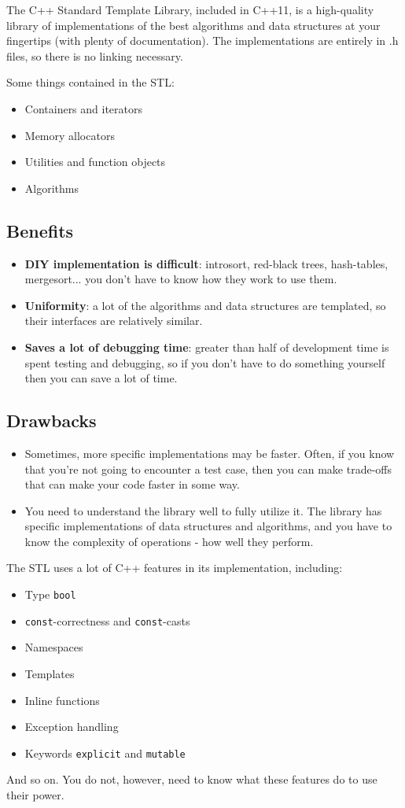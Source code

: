The C++ Standard Template Library, included in C++11, is a high-quality library of implementations of the best algorithms and data structures at your fingertips (with plenty of documentation). The implementations are entirely in .h files, so there is no linking necessary.

Some things contained in the STL:
\begin{itemize}
	\item Containers and iterators
	\item Memory allocators
	\item Utilities and function objects
	\item Algorithms
\end{itemize}

\subsection{Benefits}
\begin{itemize}
	\item \textbf{DIY implementation is difficult}: introsort, red-black trees, hash-tables, mergesort... you don't have to know how they work to use them.
	\item \textbf{Uniformity}: a lot of the algorithms and data structures are templated, so their interfaces are relatively similar.
	\item \textbf{Saves a lot of debugging time}: greater than half of development time is spent testing and debugging, so if you don't have to do something yourself then you can save a lot of time.
\end{itemize}

\subsection{Drawbacks}
\begin{itemize}
	\item Sometimes, more specific implementations may be faster. Often, if you know that you're not going to encounter a test case, then you can make trade-offs that can make your code faster in some way.
	\item You need to understand the library well to fully utilize it. The library has specific implementations of data structures and algorithms, and you have to know the complexity of operations - how well they perform.
\end{itemize}
The STL uses a lot of C++ features in its implementation, including:
\begin{itemize}
	\item Type \lstinline[style=C++]{bool}
	\item \lstinline[style=C++]{const}-correctness and \lstinline[style=C++]{const}-casts
	\item Namespaces
	\item Templates
	\item Inline functions
	\item Exception handling
	\item Keywords \lstinline[style=C++]{explicit} and \lstinline[style=C++]{mutable}
\end{itemize}
And so on. You do not, however, need to know what these features do to use their power.

